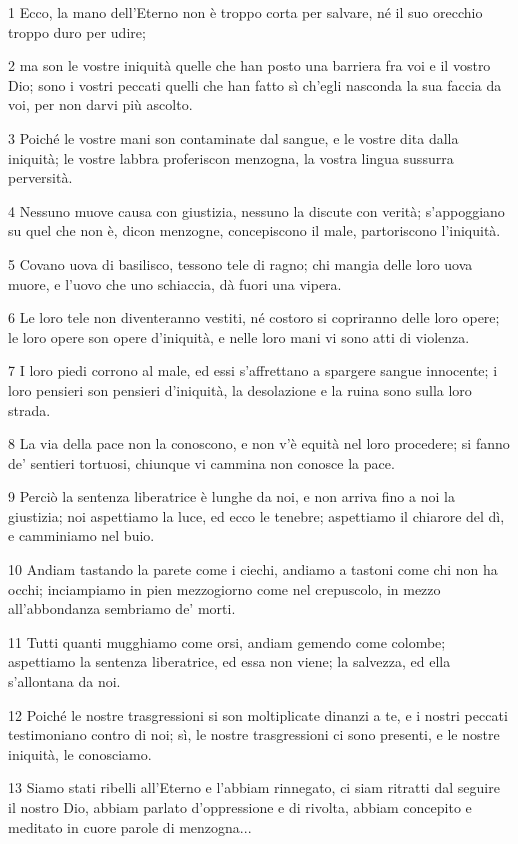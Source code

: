 \par 1 Ecco, la mano dell'Eterno non è troppo corta per salvare, né il suo orecchio troppo duro per udire;
\par 2 ma son le vostre iniquità quelle che han posto una barriera fra voi e il vostro Dio; sono i vostri peccati quelli che han fatto sì ch'egli nasconda la sua faccia da voi, per non darvi più ascolto.
\par 3 Poiché le vostre mani son contaminate dal sangue, e le vostre dita dalla iniquità; le vostre labbra proferiscon menzogna, la vostra lingua sussurra perversità.
\par 4 Nessuno muove causa con giustizia, nessuno la discute con verità; s'appoggiano su quel che non è, dicon menzogne, concepiscono il male, partoriscono l'iniquità.
\par 5 Covano uova di basilisco, tessono tele di ragno; chi mangia delle loro uova muore, e l'uovo che uno schiaccia, dà fuori una vipera.
\par 6 Le loro tele non diventeranno vestiti, né costoro si copriranno delle loro opere; le loro opere son opere d'iniquità, e nelle loro mani vi sono atti di violenza.
\par 7 I loro piedi corrono al male, ed essi s'affrettano a spargere sangue innocente; i loro pensieri son pensieri d'iniquità, la desolazione e la ruina sono sulla loro strada.
\par 8 La via della pace non la conoscono, e non v'è equità nel loro procedere; si fanno de' sentieri tortuosi, chiunque vi cammina non conosce la pace.
\par 9 Perciò la sentenza liberatrice è lunghe da noi, e non arriva fino a noi la giustizia; noi aspettiamo la luce, ed ecco le tenebre; aspettiamo il chiarore del dì, e camminiamo nel buio.
\par 10 Andiam tastando la parete come i ciechi, andiamo a tastoni come chi non ha occhi; inciampiamo in pien mezzogiorno come nel crepuscolo, in mezzo all'abbondanza sembriamo de' morti.
\par 11 Tutti quanti mugghiamo come orsi, andiam gemendo come colombe; aspettiamo la sentenza liberatrice, ed essa non viene; la salvezza, ed ella s'allontana da noi.
\par 12 Poiché le nostre trasgressioni si son moltiplicate dinanzi a te, e i nostri peccati testimoniano contro di noi; sì, le nostre trasgressioni ci sono presenti, e le nostre iniquità, le conosciamo.
\par 13 Siamo stati ribelli all'Eterno e l'abbiam rinnegato, ci siam ritratti dal seguire il nostro Dio, abbiam parlato d'oppressione e di rivolta, abbiam concepito e meditato in cuore parole di menzogna...
